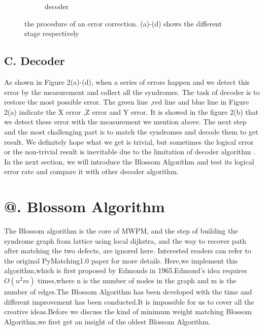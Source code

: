 \documentclass[
    a4paper, %
    10pt, %
    unnumberedsections, %
    twoside, %
]{LTJournalArticle}
\makeatletter
\newcommand{\Rmnum}[1]{\expandafter\@slowromancap\romannumeral #1@}
\makeatother
\begin{document}
\begin{figure}[htbp]
\begin{subfigure}[b]{0.45\linewidth}
        \caption{decoder}
        \label{fig:subfig4}
    \end{subfigure}
    \caption{the procedure of an error correction. (a)-(d) shows the different stage respectively}
    \label{fig:fourfigs}
    \vspace{-0.4cm}
\end{figure}
\subsection{C. Decoder}
As shown in Figure 2(a)-(d), when a series of errors happen and we detect this error by the measurement and collect all the syndromes. The task of decoder is to restore the most possible error. The green line ,red line and blue line in Figure 2(a) indicate the X error ,Z error and Y error. It is showed in the figure 2(b) that we detect these error with the measurement we mention above. The next step and the most challenging part is to match the syndromes and decode them to get result. We definitely hope what we get is trivial, but sometimes the logical error or the non-trivial result is inevitable due to the limitation of decoder algorithm \cite{9}. In the next section, we will introduce the Blossom Algorithm and test its logical error rate and compare it with other decoder algorithm.


\section{\Rmnum{3}. Blossom Algorithm}

The Blossom algorithm is the core of MWPM, and the step of building the syndrome graph from lattice using local dijkstra, and the way to recover path after matching the two defects, are ignored here. Interested readers can refer to the original PyMatching1.0 paper for more details.
Here,we implement this algorithm,which is first proposed by Edmonds in 1965.Edmond's idea requires $O(n^2m)$ times,where n is the number of nodes in the graph and m is the number of edges.The Blossom Algorithm has been developed with the time and different improvement has been conducted.It is impossible for us to cover all the creative ideas.Before we discuss the kind of minimum weight matching Blossom Algorithm,we first get an insight of the oldest Blossom Algorithm.
\end{document}
